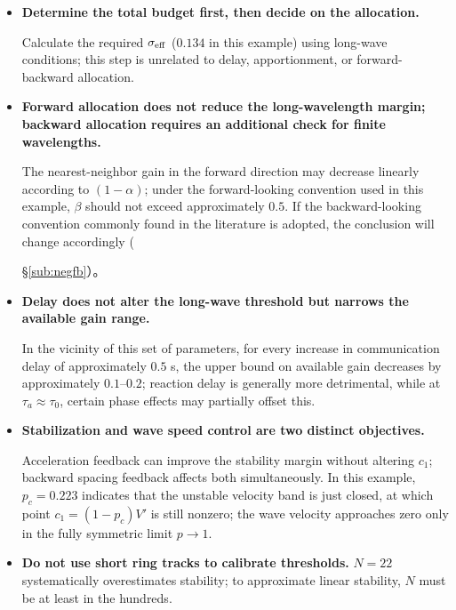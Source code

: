 \documentclass[11pt,a4paper,openany]{book}
\numberwithin{equation}{chapter}
\numberwithin{figure}{chapter}
\numberwithin{table}{chapter}
\begin{document}
\begin{itemize}[leftmargin=1.4em,itemsep=4pt]
\item \textbf{Determine the total budget first, then decide on the allocation.}




Calculate the required $\sigma_{\rm eff}$ ($0.134$ in this example) using long-wave conditions; this step is unrelated to delay, apportionment, or forward-backward allocation.


\item \textbf{Forward allocation does not reduce the long-wavelength margin; backward allocation requires an additional check for finite wavelengths.}




 The nearest-neighbor gain in the forward direction may decrease linearly according to $(1-\alpha)$; under the forward-looking convention used in this example, $\beta$ should not exceed approximately $0.5$. If the backward-looking convention commonly found in the literature is adopted, the conclusion will change accordingly (




\S\ref{sub:negfb}）。
\item \textbf{Delay does not alter the long-wave threshold but narrows the available gain range.}




 In the vicinity of this set of parameters, for every increase in communication delay of approximately $0.5$ s, the upper bound on available gain decreases by approximately $0.1$–$0.2$; reaction delay is generally more detrimental, while at $\tau_a\approx\tau_0$, certain phase effects may partially offset this.







\item \textbf{Stabilization and wave speed control are two distinct objectives.}




Acceleration feedback can improve the stability margin without altering $c_1$; backward spacing feedback affects both simultaneously. In this example, $p_c=0.223$ indicates that the unstable velocity band is just closed, at which point $c_1=(1-p_c)V'$ is still nonzero; the wave velocity approaches zero only in the fully symmetric limit $p\to1$.







\item \textbf{Do not use short ring tracks to calibrate thresholds.} $N=22$ systematically overestimates stability; to approximate linear stability, $N$ must be at least in the hundreds.







\end{itemize}
\end{document}
